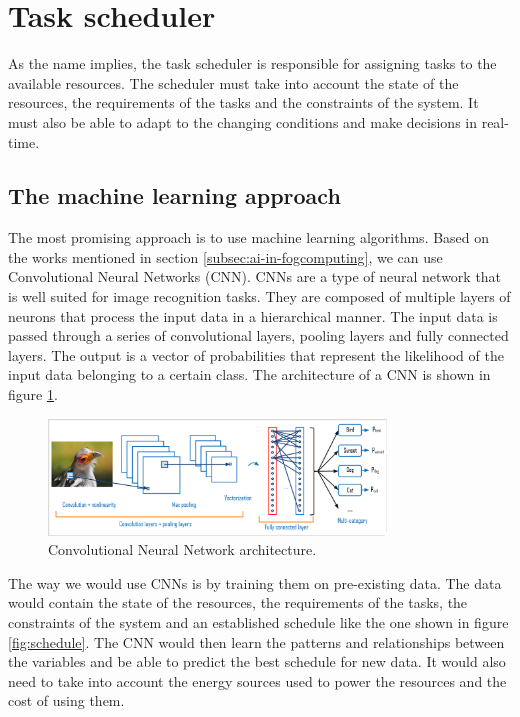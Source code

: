\section{Task scheduler}
\label{sec:task-scheduler}

As the name implies, the task scheduler is responsible for assigning tasks to the available resources. The scheduler
must take into account the state of the resources, the requirements of the tasks and the constraints of the system.
It must also be able to adapt to the changing conditions and make decisions in real-time.

\subsection{The machine learning approach}
\label{subsec:ml-approach}

The most promising approach is to use machine learning algorithms. Based on the works mentioned in section
\ref{subsec:ai-in-fogcomputing}, we can use Convolutional Neural Networks (CNN). CNNs are a type of neural network
that is well suited for image recognition tasks. They are composed of multiple layers of neurons that process the input
data in a hierarchical manner. The input data is passed through a series of convolutional layers, pooling layers and
fully connected layers. The output is a vector of probabilities that represent the likelihood of the input data belonging
to a certain class. The architecture of a CNN is shown in figure \ref{fig:cnn}.

\begin{figure}[H]
  \centering
  \includegraphics[width=0.8\textwidth]{../images/architectureCNN.png}
  \caption{Convolutional Neural Network architecture.\cite{nada-belaidi-cnn}}
  \label{fig:cnn}
\end{figure}

The way we would use CNNs is by training them on pre-existing data. The data would contain the state of the resources,
the requirements of the tasks, the constraints of the system and an established schedule like the one shown in figure
\ref{fig:schedule}. The CNN would then learn the patterns and relationships between the variables and be able to predict
the best schedule for new data. It would also need to take into account the energy sources used to power the resources
and the cost of using them.


